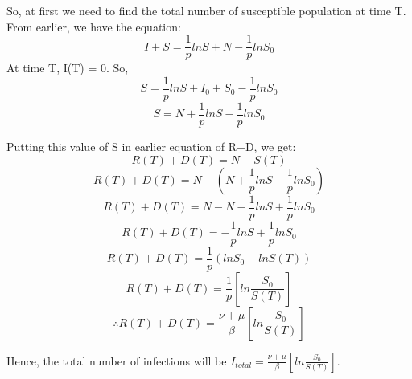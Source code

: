 \documentclass[11pt]{article}
\theoremstyle{definition}
\begin{document}
So, at first we need to find the total number of susceptible population at time T.
From earlier, we have the equation:
$$ I + S = \frac{1}{p}lnS+ N -\frac{1}{p}lnS_0$$
At time T, I(T) = 0. So,
$$ S = \frac{1}{p}lnS+ I_0 + S_0 -\frac{1}{p}lnS_0$$
$$ S = N + \frac{1}{p}lnS -\frac{1}{p}lnS_0$$

Putting this value of S in earlier equation of R+D, we get:
$$R(T)+D(T) = N-S(T)$$
$$R(T)+D(T) = N- (N + \frac{1}{p}lnS -\frac{1}{p}lnS_0)$$
$$R(T)+D(T) = N- N - \frac{1}{p}lnS +\frac{1}{p}lnS_0$$
$$R(T)+D(T) = - \frac{1}{p}lnS +\frac{1}{p}lnS_0$$
$$R(T)+D(T)= \frac{1}{p}(lnS_0-lnS(T))$$
$$R(T)+D(T)= \frac{1}{p}[ln\frac{S_0}{S(T)}]$$
$$\therefore R(T)+D(T)= \frac{\nu + \mu}{\beta}[ln\frac{S_0}{S(T)}]$$

Hence, the total number of infections will be $I_{total}=\frac{\nu + \mu}{\beta}[ln\frac{S_0}{S(T)}]$.\\
\\
\end{document}
